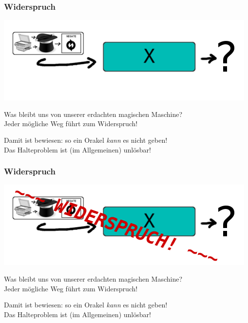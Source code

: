 \documentclass[aspectratio=43]{beamer}
\begin{document}
\begin{frame}
\frametitle{Widerspruch}
\begin{center}
\includegraphics[scale=1.4]{images/input.png} 
\bigskip

Was bleibt uns von unserer erdachten magischen Maschine?\\
Jeder mögliche Weg führt zum Widerspruch!
\pause\bigskip

Damit ist bewiesen: so ein Orakel \emph{kann} es nicht geben!\\
Das Halteproblem ist (im Allgemeinen) unlösbar!
\end{center}
\end{frame}


\begin{frame}
\frametitle{Widerspruch}
\begin{center}
\includegraphics[scale=1.4]{images/input_contradiction.png} 
\bigskip

Was bleibt uns von unserer erdachten magischen Maschine?\\
Jeder mögliche Weg führt zum Widerspruch!
\bigskip

Damit ist bewiesen: so ein Orakel \emph{kann} es nicht geben!\\
Das Halteproblem ist (im Allgemeinen) unlösbar!
\end{center}
\end{frame}

\end{document}
